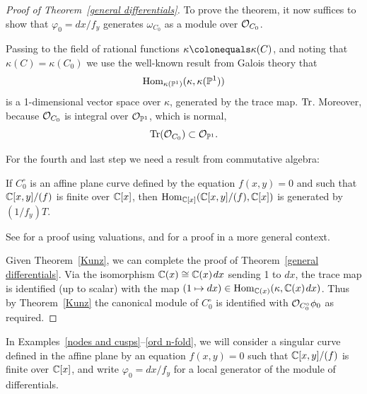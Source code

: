 \begin{proof}[Proof of Theorem~\ref{general differentials}]
 To prove the theorem, it now suffices to
show that
$\varphi_{0}=dx/f_{y}$ generates $\omega_{C_{0}}$ as a module over ${\mathcal O}_{C_{0}}$.

Passing to the field of rational functions $\kappa \colonequals
\kappa(C)$, and noting that
%
$\kappa(C) = \kappa(C_{0}) $ we use the well-known result from
Galois theory
%
that
$$
\operatorname{Hom}_{\kappa(\mathbb P^{1})}(\kappa, \kappa(\mathbb P^{1}))
$$
is a 1-dimensional vector space over $\kappa$, generated by the trace map.
%
$\operatorname{Tr}$. Moreover,
because ${\mathcal O}_{C_{0}}$ is integral over ${\mathcal O}_{\mathbb P^{1}}$, which is normal,
$$
\operatorname{Tr}({\mathcal O}_{C_{0}})\subset {\mathcal O}_{\mathbb P^{1}}.
$$

For the fourth and last step we need a
result from commutative
algebra:

\begin{theorem}\label{Kunz}
If $C_{0}^{\circ}$ is an affine plane curve defined by the
equation $f(x,y)=0$ and such that ${\mathbb C}[x,y]/(f)$ is finite over ${\mathbb C}[x]$,
then $\operatorname{Hom}_{{\mathbb C}[x]}({\mathbb C}[x,y]/(f), {\mathbb C}[x])$ is generated by $(1/f_{y})T$.
\unif
\end{theorem}

See \cite[Theorem 15.1]{Kunz} for a proof using valuations, and
\cite[Theorem A.1]{MR4026452} for a proof in
a more general context.

Given Theorem~\ref{Kunz}, we can complete the proof of
Theorem~\ref{general differentials}. Via the isomorphism ${\mathbb C}(x) \cong
{\mathbb C}(x)\kern1ptdx$ sending 1 to $dx$, the trace map is identified (up to scalar)
with the map $(1\mapsto dx) \in \operatorname{Hom}_{{\mathbb C}(x)}(\kappa, {\mathbb C}(x)\kern1ptdx)$. Thus
by Theorem~\ref{Kunz}
the canonical module of $C_{0}^{\circ}$ is identified with
${\mathcal O}_{C_{0}^\circ} \phi_{0}$ as
required.
\end{proof}

In Examples~\ref{nodes and cusps}--\ref{ord n-fold}, we will consider a singular
 curve defined in the affine plane by an equation $f(x,y) = 0$
 such that ${\mathbb C}[x,y]/(f)$ is finite over ${\mathbb C}[x]$, and write $\varphi_{0} = dx/f_{y}$
 for a local generator of the module of differentials.

